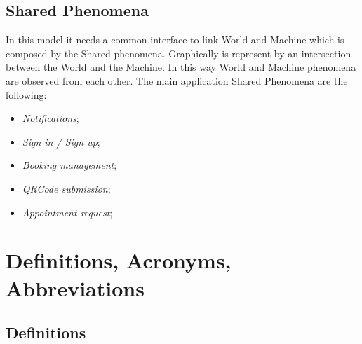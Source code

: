 \subsection{Shared Phenomena} 
In this model it needs a common interface to link World and Machine which is composed by the Shared phenomena. Graphically is represent by an intersection between the World and the Machine. In this way World and Machine phenomena are observed from each other.  
The main application Shared Phenomena are the following:

\begin{itemize}
\item \textit{Notifications};
\item \textit{Sign in / Sign up};
\item \textit{Booking management};
\item \textit{QRCode submission};
\item \textit{Appointment request};
\end{itemize}


\section{Definitions, Acronyms, Abbreviations}
\subsection{Definitions}

